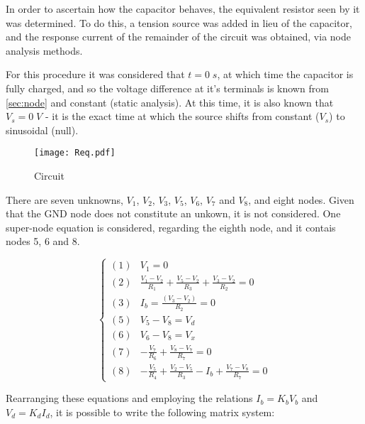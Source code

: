 In order to ascertain how the capacitor behaves, the equivalent resistor seen by it was determined. To do this, a tension source was added in lieu of the capacitor, and the response current of the remainder of the circuit was obtained, via node analysis methods.

For this procedure it was considered that $t=0\;s$, at which time the capacitor is fully charged, and so the voltage difference at it's terminals is known from \ref{sec:node} and constant (static analysis). At this time, it is also known that $V_s=0\;V$ - it is the exact time at which the source shifts from constant ($V_s$) to sinusoidal (null).

\begin{figure}[H]
  \centering
  \texttt{[image: Req.pdf]}
  \caption{Circuit}
  \label{Req_fig}
\end{figure}

There are seven unknowns, $V_1$, $V_2$, $V_3$, $V_5$, $V_6$, $V_7$ and $V_8$, and eight nodes. Given that the GND node does not constitute an unkown, it is not considered. One super-node equation is considered, regarding the eighth node, and it contais nodes 5, 6 and 8.

\begin{equation}
  \begin{cases}
    (1) & V_1=0 \\
    (2) & \frac{V_1-V_2}{R_1} + \frac{V_5-V_2}{R_3} + \frac{V_3-V_2}{R_2} = 0 \\
    (3) & I_b = \frac{(V_3-V_2)}{R_2} = 0 \\
    (5) & V_5-V_8 = V_d \\
    (6) & V_6-V_8 = V_x \\
    (7) & -\frac{V_7}{R_6} + \frac{V_8-V_7}{R_7} = 0 \\
    (8) & -\frac{V_5}{R_4}+\frac{V_2-V_5}{R_3}-I_b+\frac{V_7-V_8}{R_7} = 0
  \end{cases}
\end{equation}

Rearranging these equations and employing the relations $I_b = K_bV_b$ and $V_d = K_dI_d$, it is possible to write the following matrix system:

